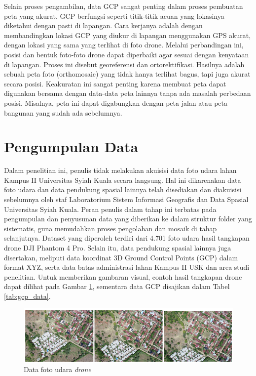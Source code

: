 Selain proses pengambilan, data GCP sangat penting dalam proses pembuatan peta yang akurat. GCP berfungsi seperti titik-titik acuan yang lokasinya diketahui dengan pasti di lapangan. Cara kerjanya adalah dengan membandingkan lokasi GCP yang diukur di lapangan menggunakan GPS akurat, dengan lokasi yang sama yang terlihat di foto drone. Melalui perbandingan ini, posisi dan bentuk foto-foto drone dapat diperbaiki agar sesuai dengan kenyataan di lapangan. Proses ini disebut georeferensi dan ortorektifikasi. Hasilnya adalah sebuah peta foto (orthomosaic) yang tidak hanya terlihat bagus, tapi juga akurat secara posisi. Keakuratan ini sangat penting karena membuat peta dapat digunakan bersama dengan data-data peta lainnya tanpa ada masalah perbedaan posisi. Misalnya, peta ini dapat digabungkan dengan peta jalan atau peta bangunan yang sudah ada sebelumnya.

\section{Pengumpulan Data}

Dalam penelitian ini, penulis tidak melakukan akuisisi data foto udara lahan Kampus II Universitas Syiah Kuala secara langsung. Hal ini dikarenakan data foto udara dan data pendukung spasial lainnya telah disediakan dan diakuisisi sebelumnya oleh staf Laboratorium Sistem Informasi Geografis dan Data Spasial Universitas Syiah Kuala. Peran penulis dalam tahap ini terbatas pada pengumpulan dan penyusunan data yang diberikan ke dalam struktur folder yang sistematis, guna memudahkan proses pengolahan dan mosaik di tahap selanjutnya. Dataset yang diperoleh terdiri dari 4.701 foto udara hasil tangkapan drone DJI Phantom 4 Pro. Selain itu, data pendukung spasial lainnya juga disertakan, meliputi data koordinat 3D Ground Control Points (GCP) dalam format XYZ, serta data batas administrasi lahan Kampus II USK dan area studi penelitian. Untuk memberikan gambaran visual, contoh hasil tangkapan drone dapat dilihat pada Gambar \ref{pengda}, sementara data GCP disajikan dalam Tabel \ref{tab:gcp_data}.

\begin{figure} [H]
    \centering
    \includegraphics[width=1\linewidth]{image/data.png}
    \caption{Data foto udara \textit{drone}}
    \label{pengda}
\end{figure}

